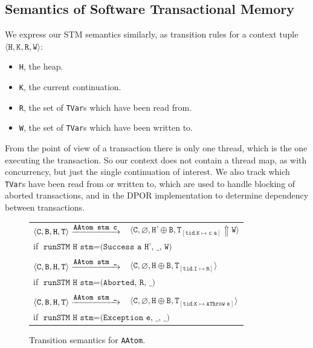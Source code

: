 \FloatBarrier
\subsection{Semantics of Software Transactional Memory}

We express our STM semantics similarly, as transition rules for a
context tuple
$\langle\texttt{H}, \texttt{K}, \texttt{R}, \texttt{W}\rangle$:

\begin{itemize}
\item \verb|H|, the heap.
\item \verb|K|, the current continuation.
\item \verb|R|, the set of \verb|TVar|s which have been read from.
\item \verb|W|, the set of \verb|TVar|s which have been written to.
\end{itemize}

From the point of view of a transaction there is only one thread,
which is the one executing the transaction.  So our context does not
contain a thread map, as with concurrency, but just the single
continuation of interest.  We also track which \verb|TVar|s have been
read from or written to, which are used to handle blocking of aborted
transactions, and in the DPOR implementation to determine dependency
between transactions.

\begin{figure}[h]
\centering
\begin{tabular}{r@{\hspace{0.5em}}l}
$\langle\texttt{C}, \texttt{B}, \texttt{H}, \texttt{T}\rangle
\xrightarrow{\texttt{\small AAtom stm c}}$&
$\langle\texttt{C}, \varnothing, \texttt{H'} \oplus \texttt{B}, \texttt{T}_{[\texttt{tid}.\texttt{K} \mapsto \texttt{c a}]} \Uparrow \texttt{W}\rangle$\\
\multicolumn{2}{l}{if $\texttt{runSTM H stm} = \texttt{(Success a H', \_, W)}$} \\
& \\
$\langle\texttt{C}, \texttt{B}, \texttt{H}, \texttt{T}\rangle
\xrightarrow{\texttt{\small AAtom stm \_}}$&
$\langle\texttt{C}, \varnothing, \texttt{H} \oplus \texttt{B}, \texttt{T}_{[\texttt{tid}.\texttt{I} \mapsto \texttt{R}]}\rangle$\\
\multicolumn{2}{l}{if $\texttt{runSTM H stm} = \texttt{(Aborted, R, \_)}$} \\
& \\
$\langle\texttt{C}, \texttt{B}, \texttt{H}, \texttt{T}\rangle
\xrightarrow{\texttt{\small AAtom stm \_}}$&
$\langle\texttt{C}, \varnothing, \texttt{H} \oplus \texttt{B}, \texttt{T}_{[\texttt{tid}.\texttt{K} \mapsto \texttt{AThrow e}]}\rangle$\\
\multicolumn{2}{l}{if $\texttt{runSTM H stm} = \texttt{(Exception e, \_, \_)}$}
\end{tabular}
\caption{Transition semantics for \texttt{AAtom}.}\label{fig:sem_aatom}
\end{figure}

